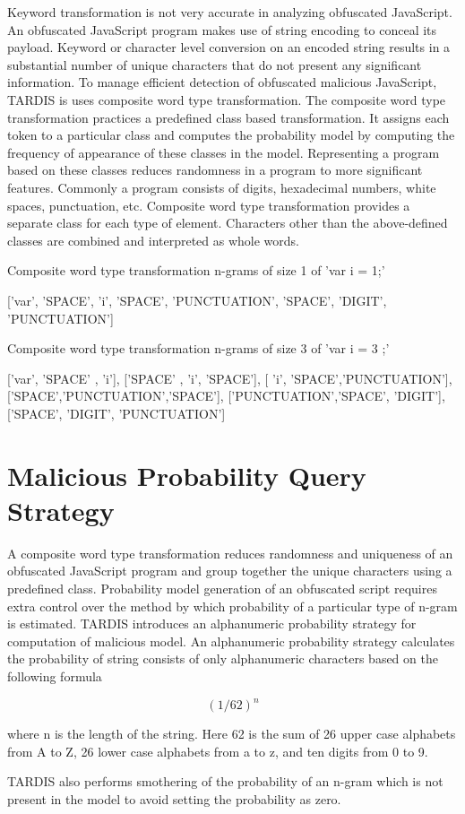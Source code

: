 Keyword transformation is not very accurate in analyzing obfuscated JavaScript. An obfuscated JavaScript program makes use of string encoding to conceal its payload. Keyword or character level conversion on an encoded string results in a substantial number of unique characters that do not present any significant information. To manage efficient detection of obfuscated malicious JavaScript, TARDIS is uses composite word type transformation. The composite word type transformation practices a predefined class based transformation. It assigns each token to a particular class and computes the probability model by computing the frequency of appearance of these classes in the model. Representing a program based on these classes reduces randomness in a program to more significant features. Commonly a program consists of  digits, hexadecimal numbers, white spaces, punctuation, etc. Composite word type transformation provides a separate class for each type of element. Characters other than the above-defined classes are combined and interpreted as whole words. 

Composite word type transformation n-grams of size 1 of 'var i = 1;'

['var', 'SPACE', 'i',  'SPACE', 'PUNCTUATION', 'SPACE', 'DIGIT', 'PUNCTUATION']

Composite word type transformation  n-grams of size 3 of 'var i = 3 ;'

['var', 'SPACE' , 'i'],  ['SPACE' , 'i', 'SPACE'], [ 'i', 'SPACE','PUNCTUATION'], ['SPACE','PUNCTUATION','SPACE'], ['PUNCTUATION','SPACE', 'DIGIT'], ['SPACE', 'DIGIT', 'PUNCTUATION']

\section{Malicious Probability Query Strategy}

A composite word type transformation reduces randomness and uniqueness of an obfuscated JavaScript program and group together the unique characters using a predefined class.  Probability model generation of an obfuscated script requires extra control over the method by which probability of a particular type of n-gram is estimated. TARDIS introduces an alphanumeric probability strategy for computation of malicious model. An alphanumeric probability strategy calculates the probability of string consists of only alphanumeric characters based on the following formula

\[ (1/ 62) ^ n\] 

where  n is the length of the string. Here 62 is the sum of 26 upper case alphabets from A to Z, 26 lower case alphabets from a to z, and ten digits from 0 to 9.

TARDIS also performs smothering of the probability of an n-gram which is not present in the model to avoid setting the probability as zero.
